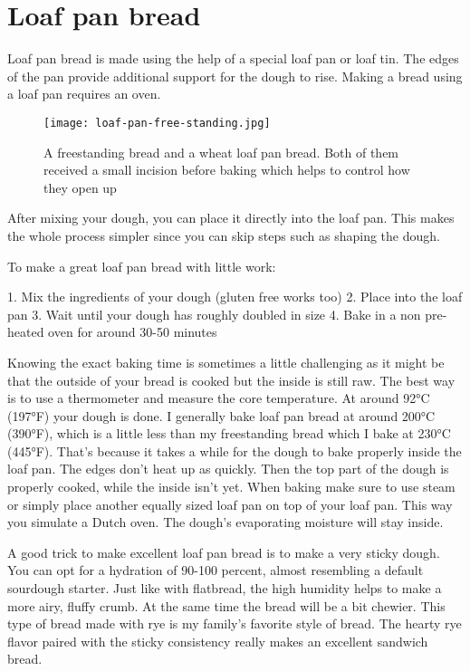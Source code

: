 \section{Loaf pan bread}

Loaf pan bread is made using the help of a special loaf pan
or loaf tin. The edges of the pan provide additional support
for the dough to rise. Making a bread using a loaf pan requires
an oven.

\begin{figure}[!htb]
  \texttt{[image: loaf-pan-free-standing.jpg]}
  \caption{A freestanding bread and a wheat loaf pan bread. Both of them
  received a small incision before baking which helps to control how they open up}
  \label{fig:free-standing-loaf-pan}
\end{figure}

After mixing your dough, you can place it directly into the loaf pan.
This makes the whole process simpler since you can skip steps such
as shaping the dough.

To make a great loaf pan bread with little work:

1. Mix the ingredients of your dough (gluten free works too)
2. Place into the loaf pan
3. Wait until your dough has roughly doubled in size
4. Bake in a non pre-heated oven for around 30-50 minutes

Knowing the exact baking time is sometimes a little challenging
as it might be that the outside of your bread is cooked but
the inside is still raw. The best way is to use a thermometer
and measure the core temperature. At around 92°C (197°F) your
dough is done. I generally bake loaf pan bread at around 200°C (390°F),
which is a little less than my freestanding bread which I bake
at 230°C (445°F). That's because it takes a while for the dough
to bake properly inside the loaf pan. The edges don't heat up
as quickly. Then the top part of the dough is properly cooked, while
the inside isn't yet. When baking make sure to use steam
or simply place another equally sized loaf pan on top
of your loaf pan. This way you simulate a Dutch oven. The dough's
evaporating moisture will stay inside.

A good trick to make excellent loaf pan bread is to make a very
sticky dough. You can opt for a hydration of 90-100 percent, almost
resembling a default sourdough starter. Just like with flatbread,
the high humidity helps to make a more airy, fluffy crumb. At
the same time the bread will be a bit chewier. This
type of bread made with rye is my family's favorite style of bread.
The hearty rye flavor paired with the sticky consistency really
makes an excellent sandwich bread.

